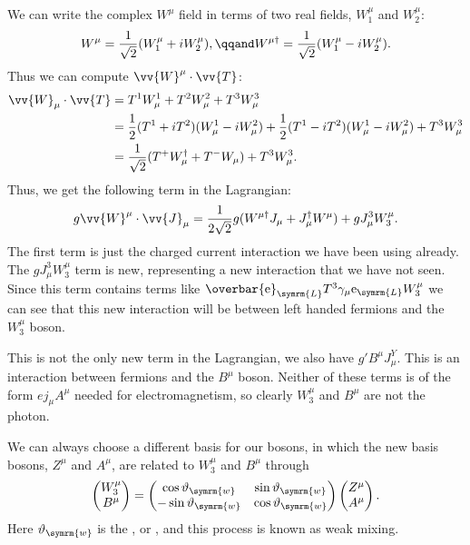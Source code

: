 \documentclass[fleqn]{NotesClass}
\newcommand{\Pparticle}[1]{\mathrm{#1}}
\newcommand{\Pex}{\ensuremath{\Pparticle{e}}}
\newcommand{\diracadjoint}[1]{\overbar{#1}}
\newcommand{\hermit}{\dagger}
\newcommand{\Left}{\symrm{L}}
\newcommand{\weinbergangle}{\vartheta_{\symrm{w}}}
\begin{document}
    We can write the complex \(W^\mu\) field in terms of two real fields, \(W_1^\mu\) and \(W_2^\mu\):
    \begin{equation}
        W^\mu = \frac{1}{\sqrt{2}}(W_1^\mu + iW_2^\mu), \qqand W^{\mu\hermit} = \frac{1}{\sqrt{2}}(W_1^\mu - iW_2^\mu).
    \end{equation}
    Thus we can compute \(\vv{W}^\mu \cdot \vv{T}\):
    \begin{align}
        \vv{W}_\mu \cdot \vv{T} &= T^1W^1_\mu + T^2W^2_\mu + T^3W^3_\mu\\
        &= \frac{1}{2}(T^1 + iT^2)(W^1_\mu - iW^2_\mu) + \frac{1}{2}(T^1 - iT^2)(W^1_\mu - iW^2_\mu) + T^3W^3_\mu\\
        &= \frac{1}{\sqrt{2}}(T^+W_\mu^\hermit + T^-W_\mu) + T^3W^3_\mu.
    \end{align}
    Thus, we get the following term in the Lagrangian:
    \begin{equation}
        g\vv{W}^\mu \cdot \vv{J}_\mu = \frac{1}{2\sqrt{2}}g(W^{\mu\hermit}J_\mu + J_\mu^\hermit W^\mu) + gJ^3_\mu W_3^\mu.
    \end{equation}
    The first term is just the charged current interaction we have been using already.
    The \(gJ^3_\mu W_3^\mu\) term is new, representing a new interaction that we have not seen.
    Since this term contains terms like \(\diracadjoint{\Pex}_{\Left} T^3 \gamma_\mu \Pex_{\Left} W_3^\mu\) we can see that this new interaction will be between left handed fermions and the \(W_3^\mu\) boson.
    
    This is not the only new term in the Lagrangian, we also have \(g'B^\mu J^Y_\mu\).
    This is an interaction between fermions and the \(B^\mu\) boson.
    Neither of these terms is of the form \(ej_\mu A^\mu\) needed for electromagnetism, so clearly \(W_3^\mu\) and \(B^\mu\) are not the photon.
    
    We can always choose a different basis for our bosons, in which the new basis bosons, \(Z^\mu\) and \(A^\mu\), are related to \(W_3^\mu\) and \(B^\mu\) through
    \begin{equation}
        \begin{pmatrix}
            W_3^\mu\\ B^\mu
        \end{pmatrix}
        =
        \begin{pmatrix}
            \cos\weinbergangle & \sin\weinbergangle\\
            -\sin\weinbergangle & \cos\weinbergangle
        \end{pmatrix}
        \begin{pmatrix}
            Z^\mu\\ A^\mu
        \end{pmatrix}
        .
    \end{equation}
    Here \(\weinbergangle\) is the , or , and this process is known as weak mixing.
    
\end{document}
